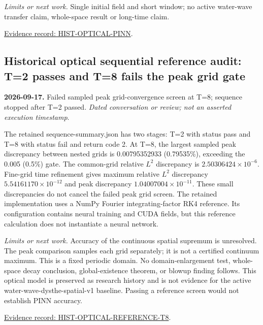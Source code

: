 \documentclass[11pt]{article}
\begin{document}
\noindent\textit{Limits or next work.} Single initial field and short window; no active water-wave transfer claim, whole-space result or long-time claim.

\noindent\href{https://github.com/matasvai/dysthe-paper/blob/codex/research-record-2026-11-05/research-record/2026-11-05/README.md#hist-optical-pinn}{Evidence record: HIST-OPTICAL-PINN}.
\subsection*{Historical optical sequential reference audit: T=2 passes and T=8 fails the peak grid gate}
\noindent\textbf{2026-09-17.} Failed sampled peak grid-convergence screen at T=8; sequence stopped after T=2 passed. \emph{Dated conversation or review; not an asserted execution timestamp}.\par
The retained sequence-summary.json has two stages: T=2 with status pass and T=8 with status fail and return code 2. At T=8, the largest sampled peak discrepancy between nested grids is 0.00795352933 (0.79535\%), exceeding the 0.005 (0.5\%) gate. The common-grid relative $L^2$ discrepancy is $2.50306424\times 10^{-6}$. Fine-grid time refinement gives maximum relative $L^2$ discrepancy $5.54161170\times 10^{-12}$ and peak discrepancy $1.04007004\times 10^{-11}$. These small discrepancies do not cancel the failed peak grid screen. The retained implementation uses a NumPy Fourier integrating-factor RK4 reference. Its configuration contains neural training and CUDA fields, but this reference calculation does not instantiate a neural network.

\noindent\textit{Limits or next work.} Accuracy of the continuous spatial supremum is unresolved. The peak comparison samples each grid separately; it is not a certified continuum maximum. This is a fixed periodic domain. No domain-enlargement test, whole-space decay conclusion, global-existence theorem, or blowup finding follows. This optical model is preserved as research history and is not evidence for the active water-wave-dysthe-spatial-v1 baseline. Passing a reference screen would not establish PINN accuracy.

\noindent\href{https://github.com/matasvai/dysthe-paper/blob/codex/research-record-2026-11-05/research-record/2026-11-05/README.md#hist-optical-reference-t8}{Evidence record: HIST-OPTICAL-REFERENCE-T8}.
\end{document}
